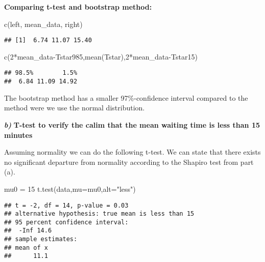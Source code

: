 \documentclass[
]{article}
\newenvironment{Shaded}{\begin{snugshade}}{\end{snugshade}}
\newcommand{\AttributeTok}[1]{\textcolor[rgb]{0.77,0.63,0.00}{#1}}
\newcommand{\DecValTok}[1]{\textcolor[rgb]{0.00,0.00,0.81}{#1}}
\newcommand{\FunctionTok}[1]{\textcolor[rgb]{0.00,0.00,0.00}{#1}}
\newcommand{\NormalTok}[1]{#1}
\newcommand{\OtherTok}[1]{\textcolor[rgb]{0.56,0.35,0.01}{#1}}
\newcommand{\SpecialCharTok}[1]{\textcolor[rgb]{0.00,0.00,0.00}{#1}}
\newcommand{\StringTok}[1]{\textcolor[rgb]{0.31,0.60,0.02}{#1}}
\begin{document}
\textbf{Comparing t-test and bootstrap method:}

\begin{Shaded}
\begin{Highlighting}[]
\FunctionTok{c}\NormalTok{(left, mean\_data, right) }
\end{Highlighting}
\end{Shaded}

\begin{verbatim}
## [1]  6.74 11.07 15.40
\end{verbatim}

\begin{Shaded}
\begin{Highlighting}[]
\FunctionTok{c}\NormalTok{(}\DecValTok{2}\SpecialCharTok{*}\NormalTok{mean\_data}\SpecialCharTok{{-}}\NormalTok{Tstar985,}\FunctionTok{mean}\NormalTok{(Tstar),}\DecValTok{2}\SpecialCharTok{*}\NormalTok{mean\_data}\SpecialCharTok{{-}}\NormalTok{Tstar15)}
\end{Highlighting}
\end{Shaded}

\begin{verbatim}
## 98.5%        1.5% 
##  6.84 11.09 14.92
\end{verbatim}

The bootstrap method has a smaller 97\%-confidence interval compared to
the method were we use the normal distribution.

\textbf{\emph{b)}} \textbf{T-test to verify the calim that the mean
waiting time is less than 15 minutes}

Assuming normality we can do the following t-test. We can state that
there exists no significant departure from normality according to the
Shapiro test from part (a).

\begin{Shaded}
\begin{Highlighting}[]
\NormalTok{mu0 }\OtherTok{=} \DecValTok{15}
\FunctionTok{t.test}\NormalTok{(data,}\AttributeTok{mu=}\NormalTok{mu0,}\AttributeTok{alt=}\StringTok{"less"}\NormalTok{)}
\end{Highlighting}
\end{Shaded}

\begin{verbatim}
## t = -2, df = 14, p-value = 0.03
## alternative hypothesis: true mean is less than 15
## 95 percent confidence interval:
##  -Inf 14.6
## sample estimates:
## mean of x 
##      11.1
\end{verbatim}
\end{document}
